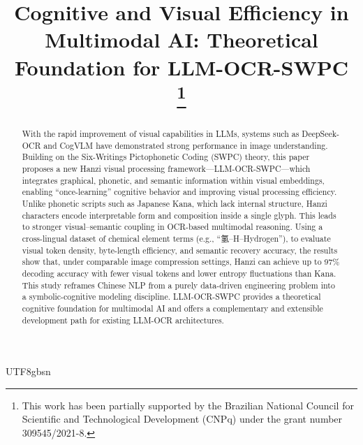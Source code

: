 \documentclass[conference]{IEEEtran}
\begin{document}
\begin{CJK*}{UTF8}{gbsn}%

\title{Cognitive and Visual Efficiency in Multimodal AI:
Theoretical Foundation for LLM-OCR-SWPC\\


\thanks{This work has been partially supported by the Brazilian National Council for Scientific and Technological Development (CNPq) under the grant number 309545/2021-8.
}
}

\author{
\and


{}


}

\maketitle

\begin{abstract}
With the rapid improvement of visual capabilities in LLMs, systems such as DeepSeek-OCR and CogVLM have demonstrated strong performance in image understanding. Building on the Six-Writings Pictophonetic Coding (SWPC) theory, this paper proposes a new Hanzi visual processing framework—LLM-OCR-SWPC—which integrates graphical, phonetic, and semantic information within visual embeddings, enabling “once-learning” cognitive behavior and improving visual processing efficiency.
Unlike phonetic scripts such as Japanese Kana, which lack internal structure, Hanzi characters encode interpretable form and composition inside a single glyph. This leads to stronger visual–semantic coupling in OCR-based multimodal reasoning. Using a cross-lingual dataset of chemical element terms (e.g., “氢–H–Hydrogen”), to evaluate visual token density, byte-length efficiency, and semantic recovery accuracy, the results show that, under comparable image compression settings, Hanzi can achieve up to 97\% decoding accuracy with fewer visual tokens and lower entropy fluctuations than Kana.
This study reframes Chinese NLP from a purely data-driven engineering problem into a symbolic-cognitive modeling discipline. LLM-OCR-SWPC provides a theoretical cognitive foundation for multimodal AI and offers a complementary and extensible development path for existing LLM-OCR architectures.


\end{abstract}
\end{CJK*}
\end{document}
